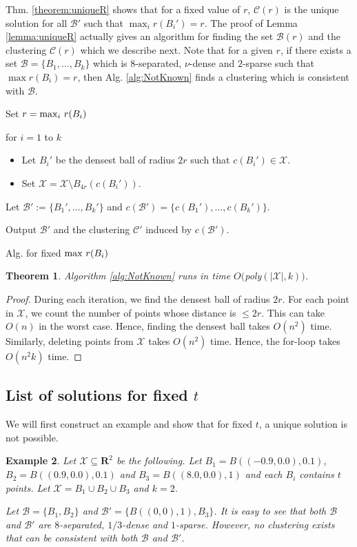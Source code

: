 \documentclass[twoside]{article}
\newcommand{\mc}{\mathcal}
\newtheorem{theorem}{Theorem}
\newtheorem{example}[theorem]{Example}
\newenvironment{alg}{
    \begin{list}{}{
        \setlength{\itemsep}{2pt}
        \setlength{\parsep}{0pt}
        \setlength{\parskip}{0pt}
        \setlength{\topsep}{1pt}
    }
}
{
    \end{list}
}
\begin{document}
Thm. \ref{theorem:uniqueR} shows that for a fixed value of $r$, $\mc C(r)$ is the unique solution for all $\mc B'$ such that $\max_i r(B_i') = r$. The proof of Lemma \ref{lemma:uniqueR} actually gives an algorithm for finding the set $\mc B(r)$ and the clustering $\mc C(r)$ which we describe next. Note that for a given $r$, if there exists a set $\mc B = \{B_1,\ldots,B_k\}$ which is $8$-separated, $\nu$-dense and $2$-sparse such that $\max r(B_i) = r$, then Alg. \ref{alg:NotKnown} finds a clustering which is consistent with $\mc B$.

\begin{algorithm}
\begin{alg}
\item[] Set $r = \max_i \thinspace r(B_i)$
\item[] for $i=1$ to $k$
	\begin{itemize}
		\item[] Let $B_i'$ be the densest ball of radius $2r$ such that $c(B_i') \in \mathcal{X}$.
		\item[] Set $\mc X=\mc X\setminus B_{4r}(c(B_i'))$. 
	\end{itemize}
\item[] Let $\mc B' := \{B_1',\ldots,B_k'\}$ and $c(\mc B') = \{c(B_1'),\ldots,c(B_k')\}$.
\item[] Output $\mc B'$ and the clustering $\mc C'$ induced by $c(\mc B')$.
\label{alg:NotKnown}
\end{alg}
\caption{Alg. for fixed $\max \thinspace r(B_i)$}
\end{algorithm}

\begin{theorem}
Algorithm \ref{alg:NotKnown} runs in time $O($poly$(|\mathcal{X}|,k))$.
\end{theorem}
\begin{proof}
During each iteration, we find the densest ball of radius $2r$. For each point in $\mathcal{X}$, we count the number of points whose distance is $\le 2r$. This can take $O(n)$ in the worst case. Hence, finding the densest ball takes $O(n^2)$ time. Similarly, deleting points from $\mathcal{X}$ takes $O(n^2)$ time. Hence, the for-loop takes $O(n^2k)$ time.
\end{proof}

\subsection{List of solutions for fixed $t$}
\label{section:structureT}
We will first construct an example and show that for fixed $t$, a unique solution is not possible.
\begin{example}
\label{example:notuniqueT}
Let $\mc X \subseteq \mathbf{R}^2$ be the following. Let $B_1 = B((-0.9, 0.0), 0.1)$, $B_2 = B((0.9, 0.0), 0.1)$ and $B_3 = B((8.0, 0.0), 1)$ and each $B_i$ contains $t$ points. Let $\mc X = B_1 \cup B_2 \cup B_3$ and $k = 2$.

Let $\mc B = \{B_1, B_2\}$ and $\mc B' = \{B((0,0), 1), B_3\}$. It is easy to see that both $\mc B$ and $\mc B'$ are $8$-separated, $1/3$-dense and $1$-sparse. However, no clustering exists that can be consistent with both $\mc B$ and $\mc B'$.
\end{example}
\end{document}
